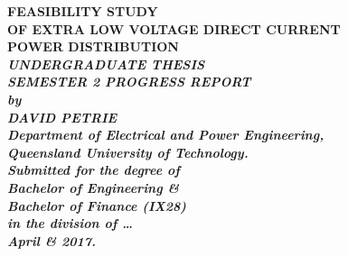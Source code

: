 \begin{titlepage}
\renewcommand{\baselinestretch}{1.0}
\begin{center}
\vspace*{35mm}
\Huge\bf
		FEASIBILITY STUDY\\
		OF EXTRA LOW VOLTAGE DIRECT CURRENT\\
		POWER DISTRIBUTION\\
\vspace{6mm}
\large\sl\bf
		UNDERGRADUATE THESIS\\
\vspace{4mm}
\large\sl\bf
		SEMESTER 2 PROGRESS REPORT\\
\vspace{13mm}
\large\sl
		by\\
		DAVID PETRIE
		\medskip\\
\rm
		Department of Electrical and Power Engineering,\\
		Queensland University of Technology.\\
\vspace{20mm}
		Submitted for the degree of\\
		Bachelor of Engineering \& \\
		Bachelor of Finance (IX28)
		\smallskip\\ [2cm]
\normalsize
		in the division of \ldots
		\medskip\\
\large
		April \& 2017.		
\end{center}
\end{titlepage}